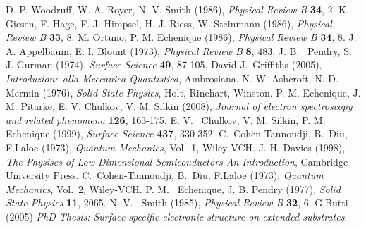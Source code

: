 \begin{thebibliography}{50}
  D. P. Woodruff, W. A. Royer, N. V. Smith (1986), \emph{Physical Review B} {\bf 34}, 2.
  K. Giesen, F. Hage, F. J. Himpsel, H. J. Riess, W. Steinmann (1986), \emph{Physical Review B} {\bf 33}, 8.
   M. Ortuno, P. M. Echenique (1986), \emph{Physical Review B} {\bf 34}, 8.
   J. A. Appelbaum, E. I. Blount (1973), \emph{Physical Review B} {\bf 8}, 483.
  J. B. ~Pendry, S. J. Gurman (1974), \emph{Surface Science } {\bf 49}, 87-105.   
  David J.~Griffiths (2005), \emph{Introduzione alla Meccanica Quantistica}, Ambrosiana.
 N. W. Ashcroft, N. D. Mermin (1976), \emph{Solid State Physics}, Holt, Rinehart, Winston.
	 P. M. Echenique, J. M. Pitarke, E. V. Chulkov, V. M. Silkin (2008), \emph{Journal of electron spectroscopy and related phenomena} {\bf 126}, 163-175.
 E. V. ~Chulkov, V. M. Silkin, P. M. Echenique (1999), \emph{Surface Science} {\bf 437}, 330-352.
  C.~Cohen-Tannoudji, B.~Diu, F.Laloe (1973), \emph{Quantum Mechanics}, Vol.~1, Wiley-VCH.
  J. H. Davies (1998), \emph{The Physiscs of Low Dimensional Semiconductors-An Introduction}, Cambridge University Press.
    C.~Cohen-Tannoudji, B.~Diu, F.Laloe (1973), \emph{Quantum Mechanics}, Vol.~2, Wiley-VCH.
  P. M. ~Echenique, J. B. Pendry (1977), \emph{Solid State Physics} {\bf 11}, 2065.
  N. V. ~Smith (1985), \emph{Physical Review B} {\bf 32}, 6.
   \bibitem {} G.Butti (2005) \emph{PhD Thesis: Surface specific electronic structure on extended substrates}.

\end{thebibliography}